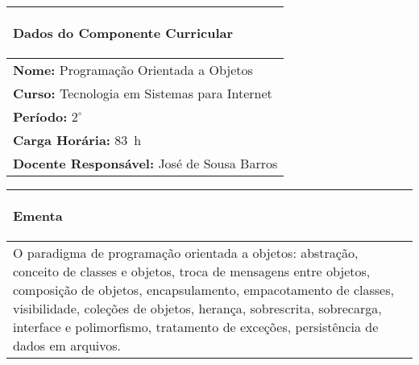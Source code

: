 

\begin{table}[h!]
	

\centering
\begin{small} 
\setlength{\tabcolsep}{3pt} 
\begin{tabular}{|p{15cm}|}\hline


\begin{center}\textbf{Dados do Componente Curricular}\end{center}\\ \hline

\textbf{Nome:} Programação Orientada a Objetos \\ \hline
\textbf{Curso:} Tecnologia em Sistemas para Internet \\ \hline
\textbf{Período:} $2^{\circ}$ \\ \hline
\textbf{Carga Horária:} 83~h \\ \hline
\textbf{Docente Responsável:} José de Sousa Barros \\ \hline


\end{tabular} 
\end{small}
\label{dadosinstituicao}
\end{table} 

\begin{table}[h!]
\centering
\begin{small} 
\setlength{\tabcolsep}{1pt} 
\begin{tabular}{|p{15cm}|}\hline

\begin{center}\textbf{Ementa}\end{center}\\ \hline
O paradigma de programação orientada a objetos: abstração, conceito de classes e objetos, troca de mensagens entre objetos, composição de objetos, encapsulamento, empacotamento de classes, visibilidade, coleções de objetos, herança, sobrescrita, sobrecarga, interface e polimorfismo, tratamento de exceções, persistência de dados em arquivos. \\ \hline

\end{tabular} 
\end{small}
\label{dadosinstituicao}
\end{table} 

